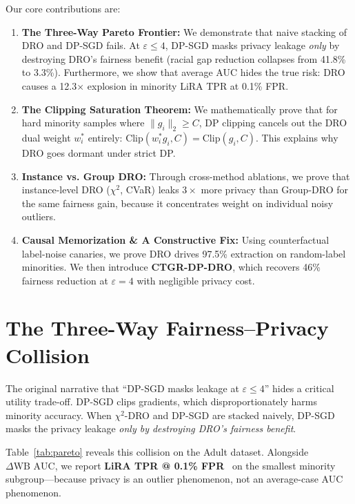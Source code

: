 \documentclass[11pt, a4paper]{article}
\begin{document}
Our core contributions are:
\begin{enumerate}
    \item \textbf{The Three-Way Pareto Frontier:} We demonstrate that naive stacking of DRO and DP-SGD fails. At $\varepsilon \le 4$, DP-SGD masks privacy leakage \textit{only} by destroying DRO's fairness benefit (racial gap reduction collapses from 41.8\% to 3.3\%). Furthermore, we show that average AUC hides the true risk: DRO causes a 12.3$\times$ explosion in minority LiRA TPR at 0.1\% FPR.
    \item \textbf{The Clipping Saturation Theorem:} We mathematically prove that for hard minority samples where $\|g_i\|_2 \ge C$, DP clipping cancels out the DRO dual weight $w_i^*$ entirely: $\text{Clip}(w_i^* g_i, C) = \text{Clip}(g_i, C)$. This explains why DRO goes dormant under strict DP.
    \item \textbf{Instance vs. Group DRO:} Through cross-method ablations, we prove that instance-level DRO ($\chi^2$, CVaR) leaks $3\times$ more privacy than Group-DRO for the same fairness gain, because it concentrates weight on individual noisy outliers.
    \item \textbf{Causal Memorization \& A Constructive Fix:} Using counterfactual label-noise canaries, we prove DRO drives 97.5\% extraction on random-label minorities. We then introduce \textbf{CTGR-DP-DRO}, which recovers 46\% fairness reduction at $\varepsilon=4$ with negligible privacy cost.
\end{enumerate}

\section{The Three-Way Fairness--Privacy Collision}
The original narrative that ``DP-SGD masks leakage at $\varepsilon \le 4$'' hides a critical utility trade-off. DP-SGD clips gradients, which disproportionately harms minority accuracy. When $\chi^2$-DRO and DP-SGD are stacked naively, DP-SGD masks the privacy leakage \textit{only by destroying DRO's fairness benefit}.

Table~\ref{tab:pareto} reveals this collision on the Adult dataset. Alongside $\Delta\text{WB AUC}$, we report \textbf{LiRA TPR @ 0.1\% FPR}~\cite{carlini2022} on the smallest minority subgroup---because privacy is an outlier phenomenon, not an average-case AUC phenomenon.
\end{document}
